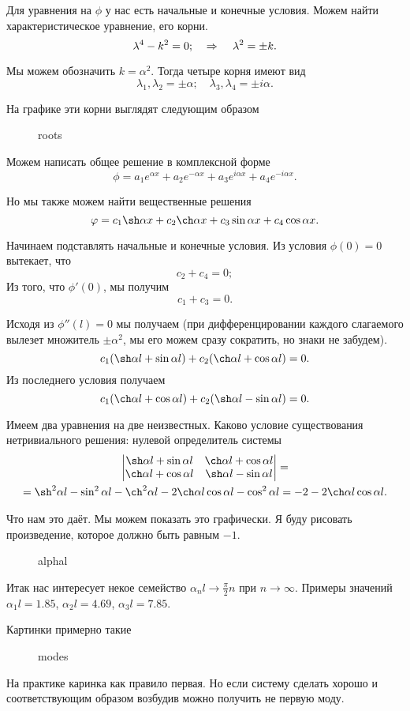 Для уравнения на $\phi$ у нас есть начальные и конечные условия. Можем найти характеристическое уравнение, его корни.
\[
  \lambda^4 - k^2  = 0;
  \quad \imp \quad
  \lambda^2 = \pm k.
\]

Мы можем обозначить $k=\alpha^2$. Тогда четыре корня имеют вид
\[
  \lambda_1, \lambda_2 = \pm \alpha;\quad
  \lambda_3, \lambda_4 = \pm i\alpha.
\]

На графике эти корни выглядят следующим образом
\begin{figure}[H]
  \centering
  \caption{roots}
  \label{fig:roots}
\end{figure}

Можем написать общее решение в комплексной форме
\[
  \phi = a_1 e^{\alpha x} + a_2 e^{-\alpha x} + a_3 e^{i\alpha x} + a_4 e^{-i\alpha x}.
\]

Но мы также можем найти вещественные решения
\[
  \phi = c_1 \sh \alpha x + c_2 \ch \alpha x + c_3 \sin \alpha x + c_4 \cos \alpha x.
\]

Начинаем подставлять начальные и конечные условия. Из условия $\phi(0) = 0$ вытекает, что
\[
  c_2 + c_4 = 0;
\]
Из того, что $\phi'(0)$, мы получим
\[
  c_1 + c_3 = 0.
\]

Исходя из $\phi''(l) = 0$ мы получаем (при дифференцировании каждого слагаемого вылезет множитель $\pm\alpha^2$, мы его можем сразу сократить, но знаки не забудем).
\[
  c_1 (\sh \alpha l  + \sin \alpha l) + c_2 (\ch\alpha l + \cos \alpha l) = 0.
\]
Из последнего условия получаем
\[
  c_1 (\ch \alpha l + \cos \alpha l) + c_2 (\sh \alpha l - \sin \alpha l) = 0.
\]

Имеем два уравнения на две неизвестных. Каково условие существования нетривиального решения: нулевой определитель системы
\begin{multline*}
  \begin{vmatrix}
    \sh\alpha l + \sin \alpha l & \ch \alpha l + \cos \alpha l \\
    \ch \alpha l + \cos \alpha l& \sh\alpha l - \sin \alpha l
  \end{vmatrix} = \\
   = \sh^2\alpha l - \sin^2 \alpha l - \ch^2 \alpha l - 2\ch \alpha l \cos \alpha l - \cos^2\alpha l = -2 - 2\ch\alpha l \cos \alpha l.
 \end{multline*}

 Что нам это даёт. Мы можем показать это графически. Я буду рисовать произведение, которое должно быть равным $-1$.
 \begin{figure}[H]
   \centering
   \caption{alphal}
   \label{fig:alphal}
 \end{figure}
 Итак нас интересует некое семейство $\alpha_n l \to \frac\pi2 n$ при $n\to\infty$. Примеры значений $\alpha_1 l = 1.85$, $\alpha_2 l = 4.69$, $\alpha_3 l = 7.85$.

 Картинки примерно такие
 \begin{figure}[H]
   \centering
   \caption{modes}
   \label{fig:modes}
 \end{figure}

 На практике каринка как правило первая. Но если систему сделать хорошо и соответствующим образом возбудив можно получить не первую моду.
